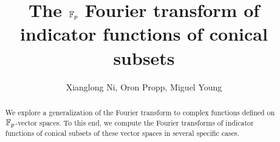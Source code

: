 \documentclass[10pt,a4paper]{amsart}
\begin{document}
	\title{The $\mathbb{F}_p$ Fourier transform of indicator functions of conical subsets}
	\author{Xianglong Ni, Oron Propp, Miguel Young }
	
	\maketitle

	\begin{abstract}
	    We explore a generalization of the Fourier transform to complex
	    functions defined on $\mathbb{F}_p$-vector spaces. To this end, we compute the Fourier
	    transforms of indicator functions of conical subsets of these vector spaces in several specific cases.
	\end{abstract}
	
	\tableofcontents

    
    
	
	
    
	\clearpage
	\appendix
	

    
	
\end{document}
